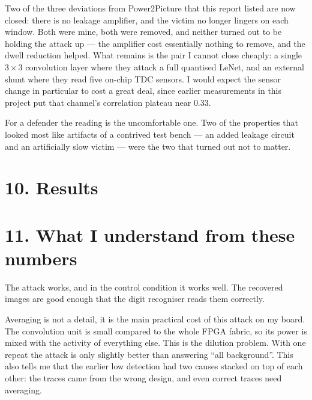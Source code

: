 \documentclass[11pt,a4paper]{article}
\begin{document}
Two of the three deviations from Power2Picture that this report listed are now closed:
there is no leakage amplifier, and the victim no longer lingers on each window. Both were
mine, both were removed, and neither turned out to be holding the attack up --- the
amplifier cost essentially nothing to remove, and the dwell reduction helped. What remains
is the pair I cannot close cheaply: a single $3\times3$ convolution layer where they attack
a full quantised LeNet, and an external shunt where they read five on-chip TDC sensors. I
would expect the sensor change in particular to cost a great deal, since earlier
measurements in this project put that channel's correlation plateau near $0.33$.

For a defender the reading is the uncomfortable one. Two of the properties that looked most
like artifacts of a contrived test bench --- an added leakage circuit and an artificially
slow victim --- were the two that turned out not to matter.


\section*{10. Results}

\begin{table}[h]
  \centering
  \small
  \resizebox{\textwidth}{!}{}
  \caption{Main results. Every row is a real hardware capture. ``All-background'' is the
  trivial baseline and should always be compared with the pixel accuracy on its left.}
  \label{tab:headline}
\end{table}

\begin{table}[h]
  \centering
  \small
  \resizebox{\textwidth}{!}{}
  \caption{Hardware provenance of the captures used here. The functional check writes
  an image and a kernel to the FPGA, reads back the 676 outputs and compares them with a
  CPU model.}
\end{table}

\section*{11. What I understand from these numbers}

The attack works, and in the control condition it works well. The recovered images are
good enough that the digit recogniser reads them correctly.

Averaging is not a detail, it is the main practical cost of this attack on my board.
The convolution unit is small compared to the whole FPGA fabric, so its power is mixed
with the activity of everything else. This is the dilution problem. With one repeat the
attack is only slightly better than answering ``all background''. This also tells me
that the earlier low detection had two causes stacked on top of each other: the traces
came from the wrong design, and even correct traces need averaging.
\end{document}
